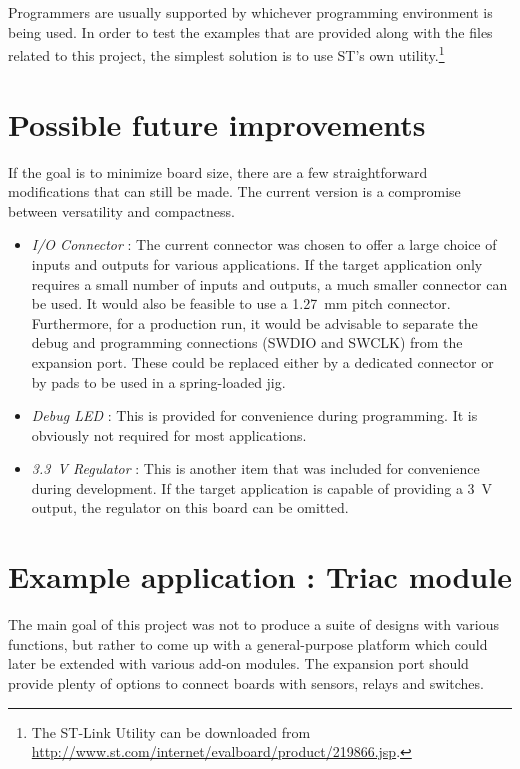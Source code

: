 Programmers are usually supported by whichever programming environment is being
used. In order to test the examples that are provided along with the files
related to this project, the simplest solution is to use ST's own
utility.\footnote{The ST-Link Utility can be downloaded from
\url{http://www.st.com/internet/evalboard/product/219866.jsp}.}



\section{Possible future improvements}

If the goal is to minimize board size, there are a few straightforward
modifications that can still be made. The current version is a compromise
between versatility and compactness.

\begin{itemize}
  \item \emph{I/O Connector} : The current connector was chosen to offer a large
    choice of inputs and outputs for various applications. If the target
    application only requires a small number of inputs and outputs, a much
    smaller connector can be used. It would also be feasible to use
    a \SI{1.27}{mm} pitch connector. 
    Furthermore, for a production run, it would be advisable to separate the
    debug and programming connections (SWDIO and SWCLK) from the expansion port.
    These could be replaced either by a dedicated connector or by pads to be
    used in a spring-loaded jig.
  \item \emph{Debug LED} : This is provided for convenience during programming.
    It is obviously not required for most applications. 
  \item \emph{\SI{3.3}{V} Regulator} : This is another item that was included
    for convenience during development. If the target application is capable of
    providing a \SI{3}{V} output, the regulator on this board can be omitted.
\end{itemize}

\section{Example application : Triac module}

The main goal of this project was not to produce a suite of designs with various
functions, but rather to come up with a general-purpose platform which could
later be extended with various add-on modules. The expansion port should provide
plenty of options to connect boards with sensors, relays and switches.

